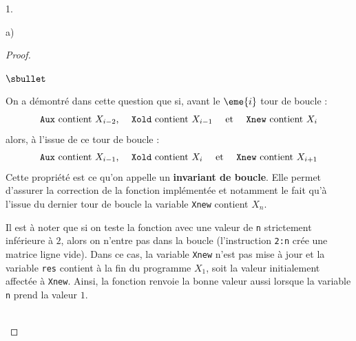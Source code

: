 \documentclass[11pt]{article}%
\begin{document}
\begin{noliste}{1.}
\begin{noliste}{a)}
\begin{proof}
\begin{remarkL}{.97}
\begin{noliste}{$\sbullet$}
        \item On a démontré dans cette question que si, avant le
          $\eme{i}$ tour de boucle : 
          \[
          \text{{\tt Aux} contient $X_{i-2}$, \quad {\tt Xold}
            contient $X_{i-1}$ \quad et \quad {\tt Xnew} contient
            $X_{i}$}
          \]
          alors, à l'issue de ce tour de boucle :
          \[
          \text{{\tt Aux} contient $X_{i-1}$, \quad {\tt Xold}
            contient $X_{i}$ \quad et \quad {\tt Xnew} contient
            $X_{i+1}$}
          \]
          Cette propriété est ce qu'on appelle un {\bf invariant de
            boucle}. Elle permet d'assurer la correction de la
          fonction implémentée et notamment le fait qu'à l'issue du
          dernier tour de boucle la variable {\tt Xnew} contient
          $X_n$.

        \item Il est à noter que si on teste la fonction avec une
          valeur de {\tt n} strictement inférieure à $2$, alors on
          n'entre pas dans la boucle (l'instruction {\tt 2:n} crée une
          matrice ligne vide). Dans ce cas, la variable {\tt Xnew}
          n'est pas mise à jour et la variable {\tt res} contient à la
          fin du programme $X_1$, soit la valeur initialement affectée
          à {\tt Xnew}. Ainsi, la fonction renvoie la bonne valeur
          aussi lorsque la variable {\tt n} prend la valeur $1$.
        \end{noliste}
      \end{remarkL}~\\[-1.2cm]
    \end{proof}


\end{noliste}
\end{noliste}
\end{document}
